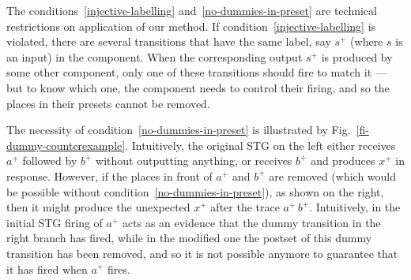 The conditions~\ref{injective-labelling}
and~\ref{no-dummies-in-preset} are technical restrictions on
application of our method. If
condition~\ref{injective-labelling} is violated, there are
several transitions that have the same label, say $s^+$ (where
$s$ is an input) in the component. When the corresponding
output $s^+$ is produced by some other component, only one of
these transitions should fire to match it --- but to know which
one, the component needs to control their firing, and so the
places in their presets cannot be removed.

The necessity of condition~\ref{no-dummies-in-preset} is
illustrated by Fig.~\ref{fi-dummy-counterexample}. Intuitively,
the original STG on the left either receives $a^+$ followed by
$b^+$ without outputting anything, or receives $b^+$ and
produces $x^+$ in response. However, if the places in front of
$a^+$ and $b^+$ are removed (which would be possible without
condition~\ref{no-dummies-in-preset}), as shown on the right,
then it might produce the unexpected $x^+$ after the trace
$a^+\,b^+$. Intuitively, in the initial STG firing of $a^+$
acts as an evidence that the dummy transition in the right
branch has fired, while in the modified one the postset of this
dummy transition has been removed, and so it is not possible
anymore to guarantee that it has fired when $a^+$ fires.

